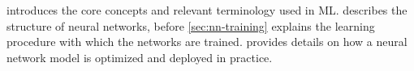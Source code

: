  introduces the core concepts and relevant terminology used in ML.
 describes the structure of neural networks, before \cref{sec:nn-training} explains the learning procedure with which the networks are trained.  provides details on how a neural network model is optimized and deployed in practice.








